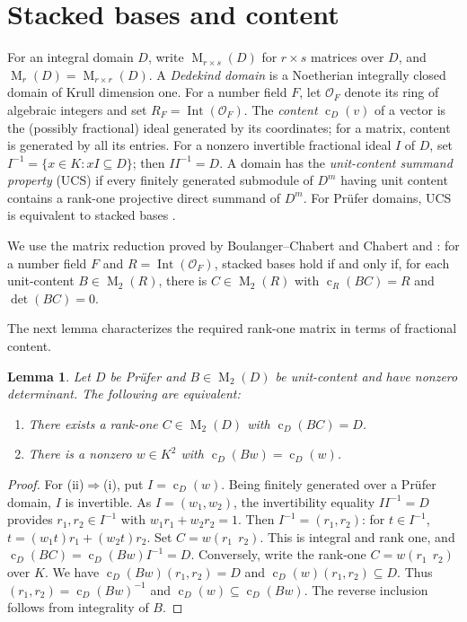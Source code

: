 \documentclass[11pt]{amsart}
\newtheorem{lemma}[theorem]{Lemma}
\theoremstyle{definition}
\theoremstyle{remark}
\newcommand{\Int}{\operatorname{Int}}
\newcommand{\cont}{\operatorname{c}}
\newcommand{\Mat}{\operatorname{M}}
\begin{document}
\section{Stacked bases and content}
For an integral domain $D$, write $\Mat_{r\times s}(D)$ for
$r\times s$ matrices over $D$, and $\Mat_r(D)=\Mat_{r\times r}(D)$.
A \emph{Dedekind domain} is a Noetherian integrally closed domain of
Krull dimension one. For a number field $F$, let $\mathcal O_F$ denote
its ring of algebraic integers and set $R_F=\Int(\mathcal O_F)$.
The \emph{content} $\cont_D(v)$
of a vector is the (possibly fractional) ideal generated by its
coordinates; for a matrix, content is generated by all its entries.
For a nonzero invertible fractional ideal $I$ of $D$, set
$I^{-1}=\{x\in K:xI\subseteq D\}$; then $II^{-1}=D$.
A domain has the \emph{unit-content summand property} (UCS) if every
finitely generated submodule of $D^m$ having unit content contains a
rank-one projective direct summand of $D^m$. For Pr\"ufer domains,
UCS is equivalent to stacked bases \cite{BKU1987,BoulangerChabert2020}.

We use the matrix reduction proved by Boulanger--Chabert and Chabert
\cite[Theorem~5.6]{BoulangerChabert2020} and \cite[Theorem~IX.25]{Chabert2025}:
for a number field $F$ and $R=\Int(\mathcal O_F)$, stacked bases hold
if and only if, for each unit-content $B\in\Mat_2(R)$, there is
$C\in\Mat_2(R)$ with $\cont_R(BC)=R$ and $\det(BC)=0$.


The next lemma characterizes the required rank-one matrix in terms of fractional content.
\begin{lemma}\label{lem:contentmatrix}
Let $D$ be Pr\"ufer and $B\in\Mat_2(D)$ be unit-content and have nonzero
determinant. The following are equivalent:
\begin{enumerate}[label=(\roman*)]
\item There exists a rank-one $C\in\Mat_2(D)$ with $\cont_D(BC)=D$.
\item There is a nonzero $w\in K^2$ with $\cont_D(Bw)=\cont_D(w)$.
\end{enumerate}
\end{lemma}
\begin{proof}
For (ii)$\Rightarrow$(i), put $I=\cont_D(w)$. Being finitely generated over a
Pr\"ufer domain, $I$ is invertible. As $I=(w_1,w_2)$, the invertibility equality $II^{-1}=D$
provides $r_1,r_2\in I^{-1}$ with $w_1r_1+w_2r_2=1$.
Then $I^{-1}=(r_1,r_2)$: for $t\in I^{-1}$,
$t=(w_1t)r_1+(w_2t)r_2$.
Set $C=w(r_1\ \ r_2)$. This is integral and rank one, and
$\cont_D(BC)=\cont_D(Bw)I^{-1}=D$.
Conversely, write the rank-one $C=w(r_1\ \ r_2)$ over $K$. We have
$\cont_D(Bw)(r_1,r_2)=D$ and $\cont_D(w)(r_1,r_2)\subseteq D$.
Thus $(r_1,r_2)=\cont_D(Bw)^{-1}$ and
$\cont_D(w)\subseteq\cont_D(Bw)$. The reverse inclusion follows from
integrality of $B$.
\end{proof}
\end{document}

